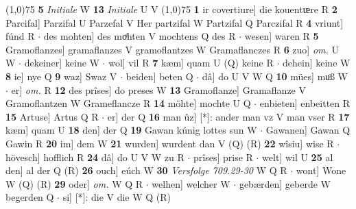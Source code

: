 \documentclass[8pt,a4paper,notitlepage]{article}
\begin{document}
\begin{table}[ht]
\begin{minipage}[t]{0.5\linewidth}
\line(1,0){75} \newline
\textbf{5} \textit{Initiale} W  \textbf{13} \textit{Initiale} U V  \newline
\line(1,0){75} \newline
\textbf{1} ir covertiure] die kouentᵫre R \textbf{2} Parcifal] Parzifal U Parzefal V Her partzifal W Partzifal Q Parczifal R \textbf{4} vriunt] fúnd R  $\cdot$ des mohten] des moͤhten V mochtens Q des R  $\cdot$ wesen] waren R \textbf{5} Gramoflanzes] gramaflanzes V gramoflantzes W Gramaflanczes R \textbf{6} zuo] \textit{om.} U W  $\cdot$ dekeiner] keine W  $\cdot$ wol] vil R \textbf{7} kæm] quam U (Q) keine R  $\cdot$ dehein] keine W \textbf{8} ie] nye Q \textbf{9} waz] Swaz V  $\cdot$ beiden] beten Q  $\cdot$ dâ] do U V W Q \textbf{10} mües] muͦß W  $\cdot$ er] \textit{om.} R \textbf{12} des prîses] do preses W \textbf{13} Gramoflanze] Gramaflanze V Gramoflantzen W Grameflancze R \textbf{14} möhte] mochte U Q  $\cdot$ enbieten] enbeitten R \textbf{15} Artuse] Artus Q R  $\cdot$ er] der Q \textbf{16} man ûz] [*]: ander man vz V man vser R \textbf{17} kæm] quam U \textbf{18} den] der Q \textbf{19} Gawan kúnig lottes sun W  $\cdot$ Gawanen] Gawan Q Gawin R \textbf{20} im] dem W \textbf{21} wurden] wurdent dan V (Q) (R) \textbf{22} wîsiu] wise R  $\cdot$ hövesch] hofflich R \textbf{24} dâ] do U V W zu R  $\cdot$ prîses] prise R  $\cdot$ welt] wil U \textbf{25} al den] al der Q (R) \textbf{26} ouch] eúch W \textbf{30} \textit{Versfolge 709.29-30} W Q R   $\cdot$ wont] Wone W (Q) (R) \textbf{29} oder] \textit{om.} W Q R  $\cdot$ welhen] welcher W  $\cdot$ gebærden] geberde W begerden Q  $\cdot$ si] [*]: die V die W Q (R) \newline
\end{minipage}
\end{table}
\end{document}
